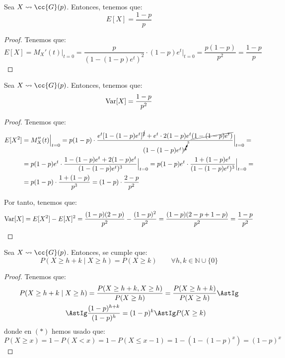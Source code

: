 \begin{coro}
    Sea $X\leadsto \cc{G}(p)$. Entonces, tenemos que:
    \begin{equation*}
        E[X] = \frac{1-p}{p}
    \end{equation*}
\end{coro}
\begin{proof}
    Tenemos que:
    \begin{equation*}
        E[X] = M_X'(t)\Big|_{t=0} = \frac{p}{(1-(1-p)e^t)^2}\cdot (1-p)e^t\Big|_{t=0} = \frac{p(1-p)}{p^2} = \frac{1-p}{p}
    \end{equation*}
\end{proof}

\begin{coro}
    Sea $X\leadsto \cc{G}(p)$. Entonces, tenemos que:
    \begin{equation*}
        \operatorname{Var}[X] = \frac{1-p}{p^2}
    \end{equation*}
\end{coro}
\begin{proof}
    Tenemos que:
    \begin{align*}
        E[X^2] &= M_X''(t)\Big|_{t=0} = p(1-p)\cdot \dfrac{e^t[1-(1-p)e^t]^{\cancel{2}} + e^t\cdot 2(1-p)e^t\cancel{(1-(1-p)e^t)}}{(1-(1-p)e^t)^{\cancelto{3}{4}}}\Big|_{t=0} =\\
        &= p(1-p)e^t\cdot \dfrac{1-(1-p)e^t + 2(1-p)e^t}{(1-(1-p)e^t)^3}\Big|_{t=0}
        = p(1-p)e^t\cdot \dfrac{1+(1-p)e^t}{(1-(1-p)e^t)^3}\Big|_{t=0} =\\
        &= p(1-p)\cdot \dfrac{1+(1-p)}{p^3}
        = (1-p)\cdot \dfrac{2-p}{p^2}
    \end{align*}

    Por tanto, tenemos que:
    \begin{equation*}
        \operatorname{Var}[X] = E[X^2] - E[X]^2
        = \dfrac{(1-p)(2-p)}{p^2} - \dfrac{(1-p)^2}{p^2}
        = \dfrac{(1-p)(2-p+1-p)}{p^2} = \dfrac{1-p}{p^2}
    \end{equation*}
\end{proof}

\begin{prop}
    Sea $X\leadsto \cc{G}(p)$. Entonces, se cumple que:
    \begin{equation*}
        P(X\geq h + k \mid X\geq h) = P(X\geq k) \qquad \forall h,k \in \mathbb{N}\cup \{0\}
    \end{equation*}
    \begin{proof}
        Tenemos que:
        \begin{align*}
            P(X\geq h + k \mid X\geq h) &= \frac{P(X\geq h+k, X\geq h)}{P(X\geq h)} = \frac{P(X\geq h+k)}{P(X\geq h)} \AstIg\\
            \AstIg & \dfrac{(1-p)^{h+k}}{(1-p)^h} = (1-p)^k \AstIg P(X\geq k)
        \end{align*}
        donde en $(\ast)$ hemos usado que:
        \begin{equation*}
            P(X\geq x) = 1-P(X<x) = 1-P(X\leq x-1) = 1-(1-(1-p)^x) = (1-p)^x
        \end{equation*}
    \end{proof}
\end{prop}

